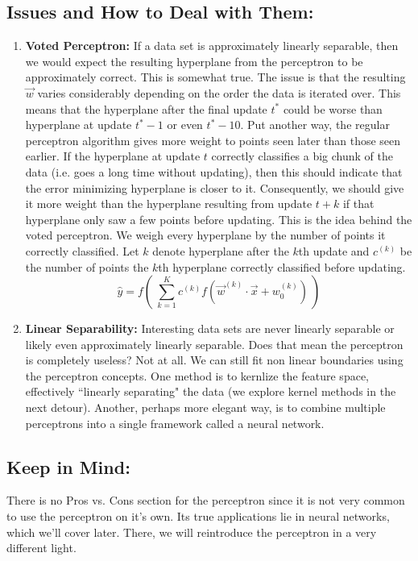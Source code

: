 \documentclass[10pt]{article}
\begin{document}
	\subsection*{Issues and How to Deal with Them:}
		\begin{enumerate}
			\item \textbf{Voted Perceptron:} If a data set is approximately linearly separable, then we would expect the 
				resulting hyperplane from the perceptron to be approximately correct. This is somewhat true. The issue
				is that the resulting $\vec w$ varies considerably depending on the order the data is iterated over. This 
				means that the hyperplane after the final update $t^*$ could be worse than hyperplane at update $t^*-1$ or
				even $t^*- 10$. Put another way, the regular perceptron algorithm gives more weight to points seen later
				than those seen earlier. If the hyperplane at update $t$ correctly classifies a big chunk of the data (i.e.
				goes a long time without updating), then this should indicate that the error minimizing hyperplane is closer
				to it. Consequently, we should give it more weight than the hyperplane resulting from update $t+k$ if that 
				hyperplane only saw a few points before updating. This is the idea behind the voted perceptron. We 
				weigh every hyperplane by the number of points it correctly classified. Let $k$ denote hyperplane
				after the $k$th update and $c^{(k)}$ be the number of points the $k$th hyperplane correctly classified 
				before updating. 
				$$ \hat y = f(\ \sum_{k=1}^{K} c^{(k)} f(\vec w^{(k)} \cdot \vec x + w_0^{(k)}) \ )$$

			\item \textbf{Linear Separability:} Interesting data sets are never linearly separable or likely even
				approximately linearly separable. Does that mean the perceptron is completely useless? Not at all. 
				We can still fit non linear boundaries using the perceptron concepts. One method is to kernlize the 
				feature space, effectively ``linearly separating" the data (we explore kernel methods in the next detour). 
				Another, perhaps more elegant way, is to combine multiple perceptrons into a single framework called a 
				neural network. 

		\end{enumerate}
		
	\subsection*{Keep in Mind:}
		There is no Pros vs. Cons section for the perceptron since it is not very common to use the perceptron 
		on it's own. Its true applications lie in neural networks, which we'll cover later. There, we will 
		reintroduce the perceptron in a very different light. 
		
\end{document}
